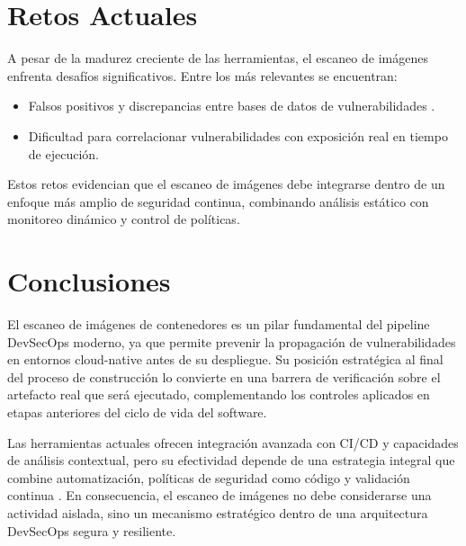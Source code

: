 \documentclass[journal]{IEEEtran}
\begin{document}
\section{Retos Actuales}

A pesar de la madurez creciente de las herramientas, el escaneo de imágenes enfrenta desafíos significativos. Entre los más relevantes se encuentran:

\begin{itemize}
    \item Falsos positivos y discrepancias entre bases de datos de vulnerabilidades \cite{ref1, ref3}.

    \item Dificultad para correlacionar vulnerabilidades con exposición real en tiempo de ejecución.
\end{itemize}

Estos retos evidencian que el escaneo de imágenes debe integrarse dentro de un enfoque más amplio de seguridad continua, combinando análisis estático con monitoreo dinámico y control de políticas.

\section{Conclusiones}

El escaneo de imágenes de contenedores es un pilar fundamental del pipeline DevSecOps moderno, ya que permite prevenir la propagación de vulnerabilidades en entornos cloud-native antes de su despliegue. Su posición estratégica al final del proceso de construcción lo convierte en una barrera de verificación sobre el artefacto real que será ejecutado, complementando los controles aplicados en etapas anteriores del ciclo de vida del software.

Las herramientas actuales ofrecen integración avanzada con CI/CD y capacidades de análisis contextual, pero su efectividad depende de una estrategia integral que combine automatización, políticas de seguridad como código y validación continua \cite{ref2, ref5, ref6}. En consecuencia, el escaneo de imágenes no debe considerarse una actividad aislada, sino un mecanismo estratégico dentro de una arquitectura DevSecOps segura y resiliente.
\end{document}
